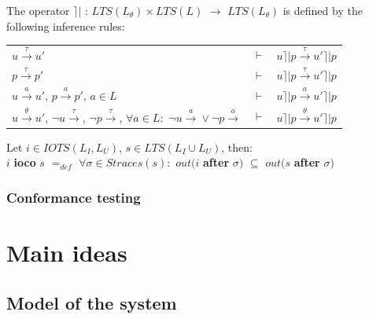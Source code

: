 \documentclass[a4paper]{report}
\begin{document}
\begin{definition}
The operator $ \rceil \vert $ : $LTS(L_{\theta}) \times LTS(L)$ $\rightarrow $ $ LTS(L_{\theta}) $ is defined by the following inference rules:\\

\begin{tabular}{lll}
   $u \xrightarrow{\tau} u'$ & $\vdash$ & $u \rceil \vert p \xrightarrow{\tau} u' \rceil \vert p$ \\
   $p \xrightarrow{\tau} p'$ & $\vdash$ & $u \rceil \vert p \xrightarrow{\tau} u' \rceil \vert p$ \\
   $u \xrightarrow{a} u'$, $p \xrightarrow{a} p'$, $a\in L$ & $\vdash$ & $u \rceil \vert p \xrightarrow{a} u' \rceil \vert p$ \\
   $u \xrightarrow{\theta} u'$, $\neg u \xrightarrow{\tau}$, $\neg p \xrightarrow{\tau}$, $\forall a \in L :$ $\neg u \xrightarrow{a} \vee \neg p \xrightarrow{a}$ & $\vdash$ & $u \rceil \vert p \xrightarrow{\theta} u' \rceil \vert p$ \\


\end{tabular}

\end{definition}

Let $i \in IOTS(L_I, L_U)$, $s \in LTS(L_I \cup L_U)$, then:\\
$i$ \textbf{ioco} $s$ $=_{def}$ $ \forall \sigma \in Straces(s): $ $out(i$ \textbf{after} $\sigma) $ $\subseteq$ $out(s$ \textbf{after} $\sigma) $\\




\subsection*{Conformance testing}





\chapter*{Main ideas}

\section*{Model of the system}
\end{document}
